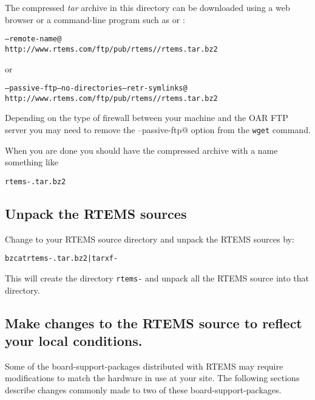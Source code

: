 \documentclass{report}
\begin{document}
The compressed {\it tar} archive in this directory can be downloaded using a web browser or a command-line program such as \verb@curl@ or \verb@wget@:
{\small
\begin{alltt}
\verb@curl --remote-name@
\hspace{0.2in}http://www.rtems.com/ftp/pub/rtems/\rtemsVersion/rtems\rtemsVersion.tar.bz2
\end{alltt}
or
\begin{alltt}
\verb@wget --passive-ftp --no-directories --retr-symlinks@
\hspace{0.2in}http://www.rtems.com/ftp/pub/rtems/\rtemsVersion/rtems\rtemsVersion.tar.bz2
\end{alltt}
}
Depending on the type of firewall between your machine and the OAR FTP server
you may need to remove the \verb@--passive-ftp@ option from the {\tt wget} command.


When you are done you should have the compressed archive with a name something like
\begin{alltt}
rtems-\rtemsVersion.tar.bz2
\end{alltt}

\subsection {Unpack the RTEMS sources}
Change to your RTEMS source directory and unpack the RTEMS sources by:
\begin{alltt}
bzcat rtems-\rtemsVersion.tar.bz2 | tar xf -
\end{alltt}
This will create the directory {\tt rtems-\rtemsVersion} 
and unpack all the RTEMS source into that directory.

\subsection {Make changes to the RTEMS source to reflect your local conditions.}
Some of the board-support-packages distributed with RTEMS may require
modifications to match the hardware in use at your site.  The following 
sections describe changes commonly made to two of these board-support-packages.
\end{document}
